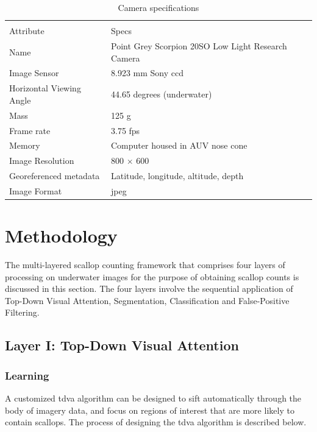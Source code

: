 \documentclass {udthesis}
\begin{document}
%                                                      
\begin{table}                                                     
\centering
\begin{tabularx}{\textwidth}{XX}
\toprule[1pt]\\[-6pt]
Attribute	&Specs\\[2pt]\midrule
Name	&Point Grey Scorpion 20SO Low Light Research Camera\\
Image Sensor	&8.923 mm Sony ccd\\
Horizontal Viewing Angle	&44.65 degrees (underwater)\\
Mass	&125 g\\
Frame rate	&3.75 fps\\
Memory	&Computer housed in AUV nose cone\\
Image Resolution	&800 $\times$ 600\\
Georeferenced metadata	&Latitude, longitude, altitude, depth\\
Image Format	&jpeg\\[2pt]\bottomrule[1pt]
\end{tabularx}
\caption{Camera specifications\label{tab:camera_specs}}
\end{table}


\section{Methodology}

The multi-layered scallop counting framework that comprises four layers of processing on underwater images for the purpose of obtaining scallop counts is discussed in this section. 
The four layers involve the sequential application of Top-Down Visual Attention, Segmentation, Classification and False-Positive Filtering.

\subsection{Layer I: Top-Down Visual Attention} \label{subsec:TDVA}

\subsubsection{Learning}

A customized \gls{tdva} algorithm can be designed 
to sift automatically through the body of imagery data, and focus on
regions of interest that are more likely to contain scallops.
The process of designing the \gls{tdva} algorithm is described below.
\end{document}
